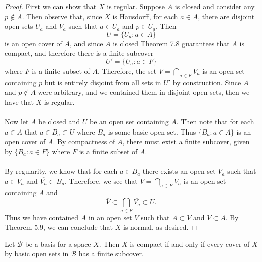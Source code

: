 \documentclass[a4paper,12pt,twoside]{hmcpset}
\begin{document}
\begin{proof}
    First we can show that $X$ is regular. Suppose $A$ is closed and
    consider any $p \notin A$. Then observe that, since $X$ is
    Hausdorff, for each $a \in A$, there are disjoint open sets $U_a$
    and $V_a$ such that $a \in U_a$ and $p \in U_a$. Then 
    $$
    U = \{U_a : a \in A\}
    $$ 
    is an open cover of $A$, and since $A$ is closed Theorem 7.8
    guarantees that $A$ is compact, and therefore there is a finite
    subcover 
    $$
    U' = \{U_a : a \in F\}
    $$
    where $F$ is a finite subset of $A$. Therefore, the set $V =
    \bigcap_{a \in F}V_a$ is an open set containing $p$ but is
    entirely disjoint from all sets in $U'$ by construction. Since $A$
    and $p \notin A$ were arbitrary, and we contained them in disjoint
    open sets, then we have that $X$ is regular. \\
    \\
    Now let $A$ be closed and $U$ be an open set containing $A$. Then
    note that for each $a \in A$ that $a \in B_a \subset U$ where
    $B_a$ is some basic open set. Thus $\{B_a : a \in A\}$ is an open
    cover of $A$. By compactness of $A$, there must exist a finite
    subcover, given by $\{B_a : a \in F\}$ where $F$ is a finite
    subset of $A$. \\
    \\
    By regularity, we know that for each $a \in B_a$ there exists an
    open set $V_a$ such that $a \in V_a$ and $\overline{V_a}\subset
    B_a$. Therefore, we see that $V = \bigcap\limits_{a \in F} V_a$ is
    an open set containing $A$ and 
    $$
    \overline{V} \subset \bigcap\limits_{a \in F}\overline{V_a} \subset U.
    $$     
    Thus we have contained $A$ in an open set $V$ such that $A \subset
    V$ and $\overline{V} \subset A$. By Theorem 5.9, we can conclude
    that $X$ is normal, as desired.
\end{proof}

\begin{problem}[Theorem 7.13] Let $\mathcal{B}$ be a basis for a space
    $X$. Then $X$ is compact if and only if every cover of $X$ by
    basic open sets in $\mathcal{B}$ has a finite subcover.
\end{problem}
\end{document}
